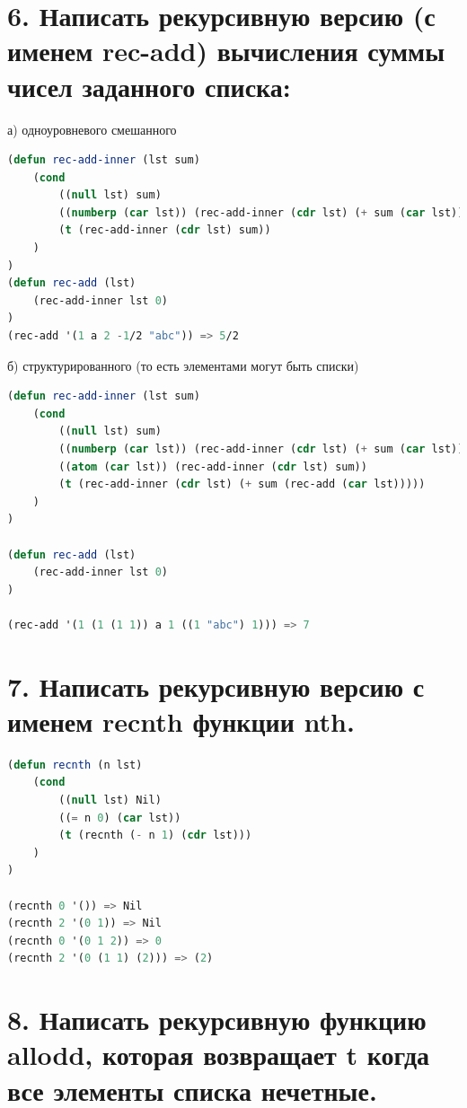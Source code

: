 \documentclass[12pt]{report}
\begin{document}
\section*{6. Написать рекурсивную версию (с именем rec-add) вычисления суммы чисел заданного списка:}

а) одноуровневого смешанного

\begin{lstlisting}[language=Lisp]
(defun rec-add-inner (lst sum)
	(cond 
		((null lst) sum)
		((numberp (car lst)) (rec-add-inner (cdr lst) (+ sum (car lst))))
		(t (rec-add-inner (cdr lst) sum))
	)
)
(defun rec-add (lst)
	(rec-add-inner lst 0)
)
(rec-add '(1 a 2 -1/2 "abc")) => 5/2
\end{lstlisting}

б) структурированного (то есть элементами могут быть списки)

\begin{lstlisting}[language=Lisp]
(defun rec-add-inner (lst sum)
	(cond 
		((null lst) sum)
		((numberp (car lst)) (rec-add-inner (cdr lst) (+ sum (car lst))))
		((atom (car lst)) (rec-add-inner (cdr lst) sum))
		(t (rec-add-inner (cdr lst) (+ sum (rec-add (car lst)))))
	)
)

(defun rec-add (lst)
	(rec-add-inner lst 0)
)

(rec-add '(1 (1 (1 1)) a 1 ((1 "abc") 1))) => 7
\end{lstlisting}



\section*{7. Написать рекурсивную версию с именем recnth функции nth.}

\begin{lstlisting}[language=Lisp]
(defun recnth (n lst)
	(cond
		((null lst) Nil)
		((= n 0) (car lst))
		(t (recnth (- n 1) (cdr lst)))
	)
)

(recnth 0 '()) => Nil
(recnth 2 '(0 1)) => Nil
(recnth 0 '(0 1 2)) => 0
(recnth 2 '(0 (1 1) (2))) => (2)
\end{lstlisting}



\clearpage
\section*{8. Написать рекурсивную функцию allodd, которая возвращает t когда все элементы списка нечетные.}
\end{document}
